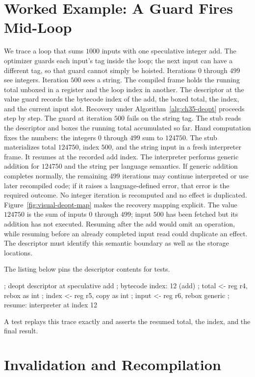 \section{Worked Example: A Guard Fires Mid-Loop}\label{sec:ch35-worked}

We trace a loop that sums $1000$ inputs with one speculative integer add.
The optimizer guards each input's tag inside the loop; the next input can have a different tag, so that guard cannot simply be hoisted.
Iterations $0$ through $499$ see integers.
Iteration $500$ sees a string.
The compiled frame holds the running total unboxed in a register and the loop index in another.
The descriptor at the value guard records the bytecode index of the add, the boxed total, the index, and the current input slot.
Recovery under Algorithm~\ref{alg:ch35-deopt} proceeds step by step.
The guard at iteration $500$ fails on the string tag.
The stub reads the descriptor and boxes the running total accumulated so far.
Hand computation fixes the numbers: the integers $0$ through $499$ sum to $124750$.
The stub materializes total $124750$, index $500$, and the string input in a fresh interpreter frame.
It resumes at the recorded add index.
The interpreter performs generic addition for $124750$ and the string per language semantics.
If generic addition completes normally, the remaining $499$ iterations may continue interpreted or use later recompiled code; if it raises a language-defined error, that error is the required outcome.
No integer iteration is recomputed and no effect is duplicated.
Figure~\ref{fig:visual-deopt-map} makes the recovery mapping explicit.
The value $124750$ is the sum of inputs $0$ through $499$; input $500$ has been fetched but its addition has not executed.
Resuming after the add would omit an operation, while resuming before an already completed input read could duplicate an effect.
The descriptor must identify this semantic boundary as well as the storage locations.



The listing below pins the descriptor contents for tests.
\begin{irlisting}
; deopt descriptor at speculative add
; bytecode index: 12 (add)
; total  <- reg r4, rebox as int
; index  <- reg r5, copy as int
; input  <- reg r6, rebox generic
; resume: interpreter at index 12
\end{irlisting}
A test replays this trace exactly and asserts the resumed total, the index, and the final result.

\section{Invalidation and Recompilation}\label{sec:ch35-invalidation}

